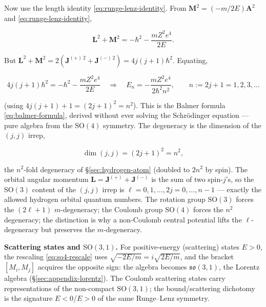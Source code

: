 Now use the length identity \eqref{eq:runge-lenz-identity}. From $\bm M^{2}=(-m/2E)\bm A^{2}$ and \eqref{eq:runge-lenz-identity},
\begin{linenomath}
\begin{equation*}
\bm L^{2}+\bm M^{2}=-\hbar^{2}-\frac{mZ^{2}e^{4}}{2E}.
\end{equation*}
\end{linenomath}
But $\bm L^{2}+\bm M^{2}=2(\bm J^{(+)\,2}+\bm J^{(-)\,2})=4j(j{+}1)\hbar^{2}$. Equating,
\begin{linenomath}
\begin{equation}
4j(j{+}1)\hbar^{2}=-\hbar^{2}-\frac{mZ^{2}e^{4}}{2E}
\quad\Longrightarrow\quad
E_{n}=-\frac{mZ^{2}e^{4}}{2\hbar^{2}n^{2}},\qquad n:=2j+1=1,2,3,\ldots
\label{eq:pauli-energy}
\end{equation}
\end{linenomath}
(using $4j(j{+}1)+1=(2j+1)^{2}=n^{2}$). This is the Balmer formula \eqref{eq:balmer-formula}, derived without ever solving the Schr\"odinger equation --- pure algebra from the $\mathrm{SO}(4)$ symmetry. The degeneracy is the dimension of the $(j,j)$ irrep,
\begin{linenomath}
\begin{equation}
\dim(j,j)=(2j+1)^{2}=n^{2},
\label{eq:hydrogen-degeneracy-so4}
\end{equation}
\end{linenomath}
the $n^{2}$-fold degeneracy of \S\ref{sec:hydrogen-atom} (doubled to $2n^{2}$ by spin). The orbital angular momentum $\bm L=\bm J^{(+)}+\bm J^{(-)}$ is the sum of two spin-$j$'s, so the $\mathrm{SO}(3)$ content of the $(j,j)$ irrep is $\ell=0,1,\ldots,2j=0,\ldots,n{-}1$ --- exactly the allowed hydrogen orbital quantum numbers. The rotation group $\mathrm{SO}(3)$ forces the $(2\ell{+}1)$ $m$-degeneracy; the Coulomb group $\mathrm{SO}(4)$ forces the $n^{2}$ degeneracy; the distinction is why a non-Coulomb central potential lifts the $\ell$-degeneracy but preserves the $m$-degeneracy.

\medskip\noindent\textbf{Scattering states and $\mathrm{SO}(3,1)$.} For positive-energy (scattering) states $E>0$, the rescaling \eqref{eq:so4-rescale} uses $\sqrt{-2E/m}=i\sqrt{2E/m}$, and the bracket $[M_{i},M_{j}]$ acquires the opposite sign: the algebra becomes $\mathfrak{so}(3,1)$, the Lorentz algebra (\S\ref{sec:appendix-lorentz}). The Coulomb scattering states carry representations of the non-compact $\mathrm{SO}(3,1)$; the bound/scattering dichotomy is the signature $E<0$/$E>0$ of the same Runge--Lenz symmetry.

